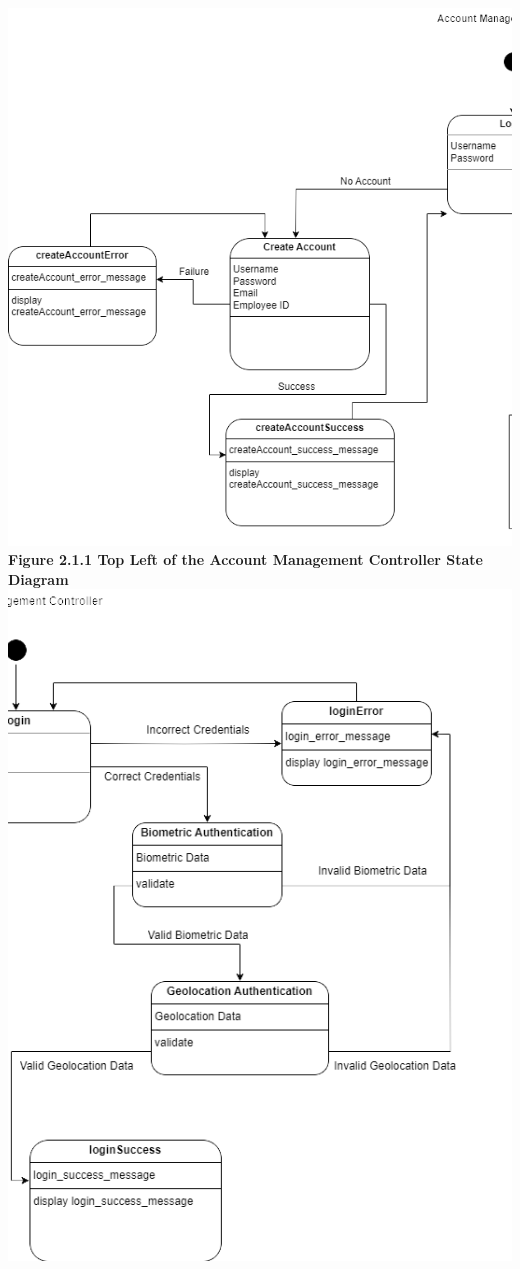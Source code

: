 \documentclass[]{article}
\begin{document}
\begin{center}
\includegraphics{../images/ControllerStateDiagrams/AMCTopLeft.png}
\textbf{Figure 2.1.1 Top Left of the Account Management Controller State Diagram}
\includegraphics{../images/ControllerStateDiagrams/AMCTopRight.png}\\

\end{center}
\end{document}
